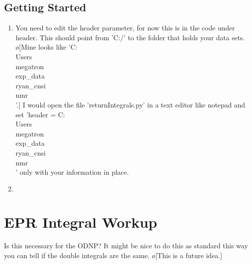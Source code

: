 \documentclass[10pt]{book}
\begin{document}
\subsection{Getting Started}
\begin{enumerate}
    \item You need to edit the header parameter, for now this is in the code under header. This should point from 'C:/' to the folder that holds your data sets. \o[Mine looks like 'C:\\Users\\megatron\\exp_data\\ryan_cnsi\\nmr\\'.] I would open the file 'returnIntegrals.py' in a text editor like notepad and set 'header = C:\\Users\\megatron\\exp_data\\ryan_cnsi\\nmr\\' only with your information in place.
    \item 
\end{enumerate}
\section{EPR Integral Workup}
Is this necessary for the ODNP? It might be nice to do this as standard this way you can tell if the double integrals are the same. \o[This is a future idea.]
\end{document}
